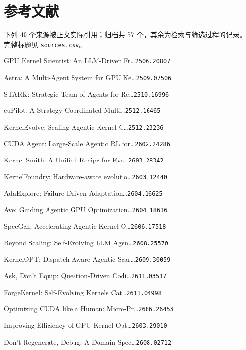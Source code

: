 \section*{参考文献}
\begingroup
\scriptsize
\setlength{\parindent}{0pt}
\setlength{\parskip}{1.4pt}
\begin{refs}
\noindent 下列 40 个来源被正文实际引用；归档共 57 个，其余为检索与筛选过程的记录。完整标题见 \texttt{sources.csv}。\par
[1] GPU Kernel Scientist: An LLM-Driven Fr\ldots{}\hfill{\texttt{2506.20807}}\par
[2] Astra: A Multi-Agent System for GPU Ke\ldots{}\hfill{\texttt{2509.07506}}\par
[3] STARK: Strategic Team of Agents for Re\ldots{}\hfill{\texttt{2510.16996}}\par
[4] cuPilot: A Strategy-Coordinated Multi\ldots{}\hfill{\texttt{2512.16465}}\par
[5] KernelEvolve: Scaling Agentic Kernel C\ldots{}\hfill{\texttt{2512.23236}}\par
[6] CUDA Agent: Large-Scale Agentic RL for\ldots{}\hfill{\texttt{2602.24286}}\par
[7] Kernel-Smith: A Unified Recipe for Evo\ldots{}\hfill{\texttt{2603.28342}}\par
[8] KernelFoundry: Hardware-aware evolutio\ldots{}\hfill{\texttt{2603.12440}}\par
[9] AdaExplore: Failure-Driven Adaptation\ldots{}\hfill{\texttt{2604.16625}}\par
[10] Ave: Guiding Agentic GPU Optimization\ldots{}\hfill{\texttt{2604.18616}}\par
[11] SpecGen: Accelerating Agentic Kernel O\ldots{}\hfill{\texttt{2606.17518}}\par
[12] Beyond Scaling: Self-Evolving LLM Agen\ldots{}\hfill{\texttt{2608.25570}}\par
[13] KernelOPT: Dispatch-Aware Agentic Sear\ldots{}\hfill{\texttt{2609.30059}}\par
[14] Ask, Don't Equip: Question-Driven Codi\ldots{}\hfill{\texttt{2611.03517}}\par
[15] ForgeKernel: Self-Evolving Kernels Cat\ldots{}\hfill{\texttt{2611.04998}}\par
[16] Optimizing CUDA like a Human: Micro-Pr\ldots{}\hfill{\texttt{2606.26453}}\par
[17] Improving Efficiency of GPU Kernel Opt\ldots{}\hfill{\texttt{2603.29010}}\par
[18] Don't Regenerate, Debug: A Domain-Spec\ldots{}\hfill{\texttt{2608.02712}}\par

\end{refs}
